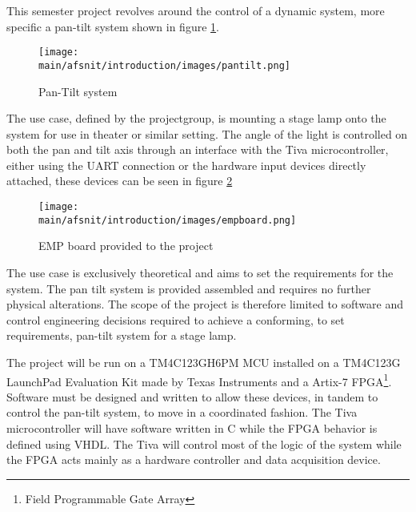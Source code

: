 \documentclass[../../main]{subfiles}
\begin{document}
This semester project revolves around the control of a dynamic system, more specific a pan-tilt  system shown in figure \ref{fig:system}.

\begin{figure}[H]
\centering
\texttt{[image: \\main/afsnit/introduction/images/pantilt.png]}
\caption{Pan-Tilt system}
\label{fig:system}
\end{figure}

The use case, defined by the projectgroup, is mounting a stage lamp onto the system for use in theater or similar setting.
The angle of the light is controlled on both the pan and tilt axis through an interface with the Tiva microcontroller, either using the UART connection or the hardware input devices directly attached, these devices can be seen in figure \ref{fig:empboard}

\begin{figure}[H]
\texttt{[image: \\main/afsnit/introduction/images/empboard.png]}
\caption{EMP board provided to the project}
\label{fig:empboard}
\end{figure}

The use case is exclusively theoretical and aims to set the requirements for the system.
The pan tilt system is provided assembled and requires no further physical alterations. The scope of the project is therefore limited to software and control engineering decisions required to achieve a conforming, to set requirements, pan-tilt system for a stage lamp.

The project will be run on a  TM4C123GH6PM MCU installed on a TM4C123G LaunchPad Evaluation Kit made by Texas Instruments and a Artix-7 FPGA\footnote{Field Programmable Gate Array}. Software must be designed and written to allow these devices, in tandem to control the pan-tilt system, to move in a coordinated fashion.
The Tiva microcontroller will have software written in C while the FPGA behavior is defined using VHDL. The Tiva will control most of the logic of the system while the FPGA acts mainly as a hardware controller and data acquisition device.
\end{document}
